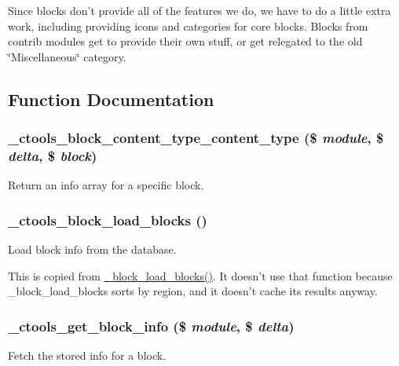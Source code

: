 Since blocks don't provide all of the features we do, we have to do a little extra work, including providing icons and categories for core blocks. Blocks from contrib modules get to provide their own stuff, or get relegated to the old \char`\"{}Miscellaneous\char`\"{} category. 

\subsection{Function Documentation}
\hypertarget{block_8inc_a28496d861d9c2b82fe8288a30ba97312}{
\subsubsection[{\_\-ctools\_\-block\_\-content\_\-type\_\-content\_\-type}]{\setlength{\rightskip}{0pt plus 5cm}\_\-ctools\_\-block\_\-content\_\-type\_\-content\_\-type (\$ {\em module}, \/  \$ {\em delta}, \/  \$ {\em block})}}
\label{block_8inc_a28496d861d9c2b82fe8288a30ba97312}
Return an info array for a specific block. \hypertarget{block_8inc_ab02ec538c54a12376c3704ec2b6cddb8}{
\subsubsection[{\_\-ctools\_\-block\_\-load\_\-blocks}]{\setlength{\rightskip}{0pt plus 5cm}\_\-ctools\_\-block\_\-load\_\-blocks ()}}
\label{block_8inc_ab02ec538c54a12376c3704ec2b6cddb8}
Load block info from the database.

This is copied from \hyperlink{block_8module_aade0870d32f13ad930bffc6630945029}{\_\-block\_\-load\_\-blocks()}. It doesn't use that function because \_\-block\_\-load\_\-blocks sorts by region, and it doesn't cache its results anyway. \hypertarget{block_8inc_a07ccb689401785f6c61bfde2d35ec58c}{
\subsubsection[{\_\-ctools\_\-get\_\-block\_\-info}]{\setlength{\rightskip}{0pt plus 5cm}\_\-ctools\_\-get\_\-block\_\-info (\$ {\em module}, \/  \$ {\em delta})}}
\label{block_8inc_a07ccb689401785f6c61bfde2d35ec58c}
Fetch the stored info for a block.


